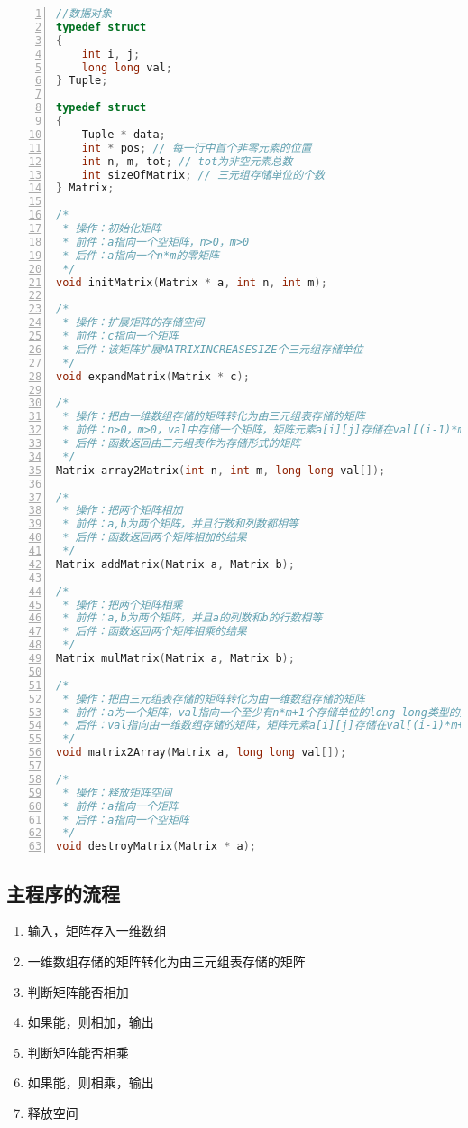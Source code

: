 \documentclass{article}
\begin{document}
\begin{lstlisting}[language={C},
    numbers=left,
    numberstyle=\tiny\consolas,
    basicstyle=\small\consolas]
//数据对象
typedef struct
{
    int i, j;
    long long val;
} Tuple;

typedef struct
{
    Tuple * data;
    int * pos; // 每一行中首个非零元素的位置
    int n, m, tot; // tot为非空元素总数
    int sizeOfMatrix; // 三元组存储单位的个数
} Matrix;

/*
 * 操作：初始化矩阵
 * 前件：a指向一个空矩阵，n>0，m>0
 * 后件：a指向一个n*m的零矩阵
 */
void initMatrix(Matrix * a, int n, int m);

/*
 * 操作：扩展矩阵的存储空间
 * 前件：c指向一个矩阵
 * 后件：该矩阵扩展MATRIXINCREASESIZE个三元组存储单位
 */
void expandMatrix(Matrix * c);

/*
 * 操作：把由一维数组存储的矩阵转化为由三元组表存储的矩阵
 * 前件：n>0，m>0，val中存储一个矩阵，矩阵元素a[i][j]存储在val[(i-1)*m+j]中
 * 后件：函数返回由三元组表作为存储形式的矩阵
 */
Matrix array2Matrix(int n, int m, long long val[]);

/*
 * 操作：把两个矩阵相加
 * 前件：a,b为两个矩阵，并且行数和列数都相等
 * 后件：函数返回两个矩阵相加的结果
 */
Matrix addMatrix(Matrix a, Matrix b);

/*
 * 操作：把两个矩阵相乘
 * 前件：a,b为两个矩阵，并且a的列数和b的行数相等
 * 后件：函数返回两个矩阵相乘的结果
 */
Matrix mulMatrix(Matrix a, Matrix b);

/*
 * 操作：把由三元组表存储的矩阵转化为由一维数组存储的矩阵
 * 前件：a为一个矩阵，val指向一个至少有n*m+1个存储单位的long long类型的数组
 * 后件：val指向由一维数组存储的矩阵，矩阵元素a[i][j]存储在val[(i-1)*m+j]中
 */
void matrix2Array(Matrix a, long long val[]);

/*
 * 操作：释放矩阵空间
 * 前件：a指向一个矩阵
 * 后件：a指向一个空矩阵
 */
void destroyMatrix(Matrix * a);
\end{lstlisting}

\subsection{主程序的流程}

\begin{enumerate}
    \item 输入，矩阵存入一维数组
    \item 一维数组存储的矩阵转化为由三元组表存储的矩阵
    \item 判断矩阵能否相加
    \item 如果能，则相加，输出
    \item 判断矩阵能否相乘
    \item 如果能，则相乘，输出
    \item 释放空间
\end{enumerate}
\end{document}
